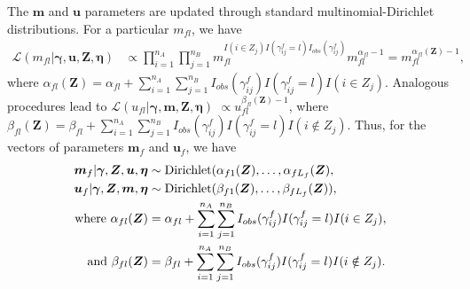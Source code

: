\documentclass[12pt,letterpaper]{article}
\newcommand{\1}[1]{\mathbb{I}\!\left[#1\right]} %
\begin{document}
The $\bm{m}$ and $\bm{u}$ parameters are updated through standard multinomial-Dirichlet distributions. For a particular $m_{fl}$, we have
\begin{align*}
	\mathcal{L}(m_{fl}|\bm{\gamma}, \bm{u}, \bm{Z}, \bm{\eta}) &\propto \prod_{i=1}^{n_A} \prod_{j=1}^{n_B} m_{fl}^{I(i \in Z_j) I(\gamma_{ij}^f = l) I_{obs}(\gamma_{ij}^f)}  m_{fl}^{\alpha_{fl} - 1} = m_{fl}^{\alpha_{fl}(\bm{Z}) - 1},
\end{align*}
where $\alpha_{fl}(\bm{Z})= \alpha_{fl} + \sum_{i=1}^{n_A}  \sum_{j=1}^{n_B} I_{obs}(\gamma_{ij}^f)I(\gamma_{ij}^f = l) I(i \in Z_j)$. Analogous procedures lead to $\mathcal{L}(u_{fl}| \bm{\gamma}, \bm{m}, \bm{Z}, \bm{\eta})$  $\propto u_{fl}^{\beta_{fl}(\bm{Z}) - 1}$, where $\beta_{fl}(\bm{Z})= \beta_{fl} + \sum_{i=1}^{n_A}  \sum_{j=1}^{n_B} I_{obs}(\gamma_{ij}^f)I(\gamma_{ij}^f = l) I(i \notin Z_j)$. Thus, for the vectors of parameters $\bm{m}_f$ and $\bm{u}_f$, we have
	\begin{align}
		\bm{m}_f|\bm{\gamma}, \bm{Z}, \bm{u}, \bm{\eta} &\sim \text{Dirichlet}(\alpha_{f1}(\bm{Z}), \ldots, \alpha_{fL_f}(\bm{Z}), \notag \\
		\bm{u}_f|\bm{\gamma}, \bm{Z}, \bm{m}, \bm{\eta} &\sim \text{Dirichlet}(\beta_{f1}(\bm{Z}), \ldots, \beta_{fL_f}(\bm{Z})), \notag \\
		\text{where }\alpha_{fl}(\bm{Z})&= \alpha_{fl} + \sum_{i=1}^{n_A}\sum_{j=1}^{n_B} I_{obs}(\gamma_{ij}^f) I(\gamma_{ij}^f = l) I(i \in Z_j), \label{eqn:alpha_update} \\
		\text{and } \beta_{fl}(\bm{Z})&=  \beta_{fl} + \sum_{i=1}^{n_A}\sum_{j=1}^{n_B}  I_{obs}(\gamma_{ij}^f) I(\gamma_{ij}^f = l) I(i \notin Z_j) \label{eqn:beta_update}.
	\end{align}
\end{document}
